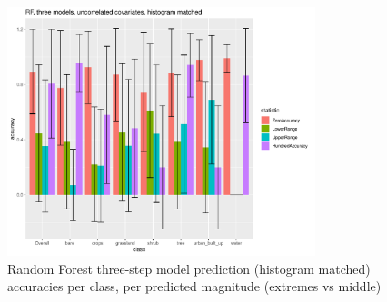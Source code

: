 \documentclass[a4paper,10pt]{article}
\begin{document}
\begin{figure}
    \includegraphics[width=0.8\textwidth]{article-figures/barplots/2019-03-22-rf-3m-uncor-hm-bar}
    \caption{Random Forest three-step model prediction (histogram matched) accuracies per class, per predicted magnitude (extremes vs middle)}
    \label{bar-rf-3m-uncor-hm}
\end{figure}
\end{document}
